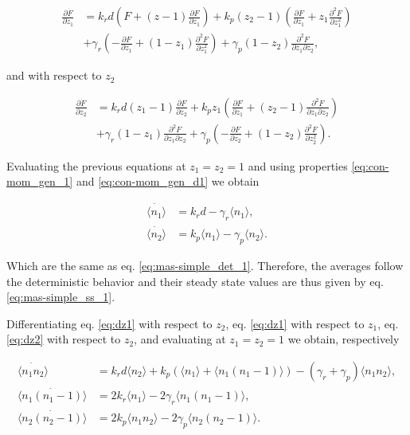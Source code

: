 \begin{equation}
  \label{eq:dz1}
  \begin{split}
    \frac{\partial \dot{F}}{\partial z_1} &= k_rd\left( F+(z-1)\frac{\partial F}{\partial z_1} \right) + k_p(z_2-1) \left( \frac{\partial F}{\partial z_1} + z_1 \frac{\partial^2 F}{\partial z_1^2} \right)\\
    &+\gamma_r\left(-\frac{\partial F}{\partial z_1}+(1-z_1)\frac{\partial^2 F}{\partial z_1^2}\right)+\gamma_p(1-z_2)\frac{\partial^2 F}{\partial z_1 \partial z_2},
  \end{split}
\end{equation}

and with respect to $z_2$

\begin{equation}
  \label{eq:dz2}
  \begin{split}
    \frac{\partial \dot{F}}{\partial z_2}&=k_rd(z_1-1)\frac{\partial F}{\partial z_2} + k_pz_1\left(\frac{\partial F}{\partial z_1} + (z_2-1)\frac{\partial^2 F}{\partial z_1 \partial z_2} \right)\\
    &+ \gamma_r(1-z_1)\frac{\partial^2 F}{\partial z_1 \partial z_2} + \gamma_p\left(-\frac{\partial F}{\partial z_2}+(1-z_2)\frac{\partial^2 F}{\partial z_2^2}\right).
  \end{split}
\end{equation}

Evaluating the previous equations at $z_1 = z_2 = 1$ and using properties \eqref{eq:con-mom_gen_1} and \eqref{eq:con-mom_gen_d1} we obtain

\begin{align*}
\dot{\langle n_1 \rangle}&= k_rd - \gamma_r \langle n_1 \rangle,\\
\dot{\langle n_2 \rangle}&= k_p\langle n_1 \rangle - \gamma_p \langle n_2 \rangle.
\end{align*}

Which are the same as eq. \eqref{eq:mas-simple_det_1}. Therefore, the averages follow the deterministic behavior and their steady state values are thus given by eq. \eqref{eq:mas-simple_ss_1}.

Differentiating eq. \eqref{eq:dz1} with respect to $z_2$, eq. \eqref{eq:dz1} with respect to $z_1$, eq. \eqref{eq:dz2} with respect to $z_2$, and evaluating at $z_1 = z_2 = 1$ we obtain, respectively

\begin{align}
  \dot{\langle n_1n_2\rangle} &= k_rd\langle n_2 \rangle + k_p\left(\langle n_1\rangle + \langle n_1(n_1-1) \rangle \right) - \left( \gamma_r + \gamma_p \right)\langle n_1n_2 \rangle,\label{eq:dz1z2}\\
  \dot{\langle n_1(n_1-1)\rangle} &= 2k_r\langle n_1\rangle-2\gamma_r\langle n_1(n_1-1) \rangle, \label{eq:dz1z1}\\
  \dot{\langle n_2(n_2-1)\rangle} &= 2k_p\langle n_1n_2 \rangle - 2\gamma_p\langle n_2(n_2-1)\rangle. \label{eq:dz2z2}
\end{align}

